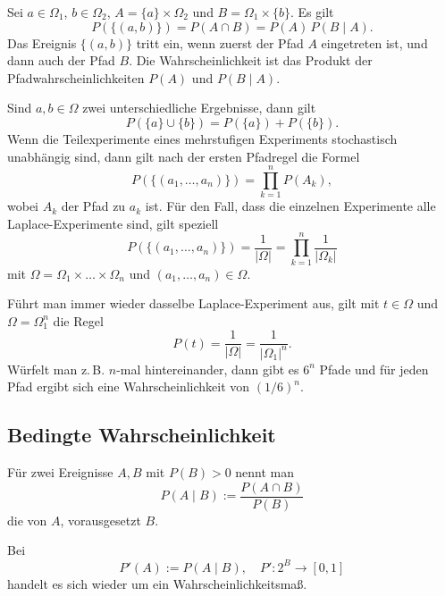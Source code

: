 Sei $a\in\Omega_1$, $b\in\Omega_2$, $A=\{a\}\times\Omega_2$
und $B=\Omega_1\times\{b\}$. Es gilt%
\begin{equation}
P(\{(a,b)\}) = P(A\cap B) = P(A)\,P(B\mid A).
\end{equation}
Das Ereignis $\{(a,b)\}$ tritt ein, wenn zuerst
der Pfad $A$ eingetreten ist, und dann auch der Pfad $B$.
Die Wahrscheinlichkeit ist das Produkt der Pfadwahrscheinlichkeiten
$P(A)$ und $P(B\mid A)$.

Sind $a,b\in\Omega$ zwei unterschiedliche
Ergebnisse, dann gilt%
\begin{equation}
P(\{a\}\cup\{b\}) = P(\{a\})+P(\{b\}).
\end{equation}
Wenn die Teilexperimente eines mehrstufigen Experiments
stochastisch unabhängig sind, dann gilt nach der ersten Pfadregel
die Formel%
\begin{equation}
P(\{(a_1,\ldots,a_n)\}) = \prod_{k=1}^n P(A_k),
\end{equation}
wobei $A_k$ der Pfad zu $a_k$ ist.
Für den Fall, dass die einzelnen
Experimente alle Laplace-Experimente sind, gilt speziell%
\begin{equation}
P(\{(a_1,\ldots,a_n)\}) = \frac{1}{|\Omega|} = \prod_{k=1}^n \frac{1}{|\Omega_k|}
\end{equation}
mit $\Omega=\Omega_1\times\ldots\times\Omega_n$ und $(a_1,\ldots,a_n)\in\Omega$.

Führt man immer wieder dasselbe Laplace-Experiment aus, gilt
mit $t\in\Omega$ und $\Omega=\Omega_1^n$ die Regel%
\begin{equation}
P(t) = \frac{1}{|\Omega|} = \frac{1}{|\Omega_1|^n}.
\end{equation}
Würfelt man z.\,B. $n$-mal hintereinander, dann gibt es $6^n$ Pfade
und für jeden Pfad ergibt sich eine Wahrscheinlichkeit von $(1/6)^n$.

\subsection{Bedingte Wahrscheinlichkeit}
\begin{definition}\mbox{}\newline%
Für zwei Ereignisse $A,B$ mit $P(B)>0$ nennt man%
\begin{equation}
P(A\mid B) := \frac{P(A\cap B)}{P(B)}
\end{equation}
die  von $A$, vorausgesetzt $B$.
\end{definition}
Bei
\begin{equation}
P'(A) := P(A\mid B),\quad P'\colon 2^B\to [0,1]
\end{equation}
handelt es sich wieder um ein Wahrscheinlichkeitsmaß.

